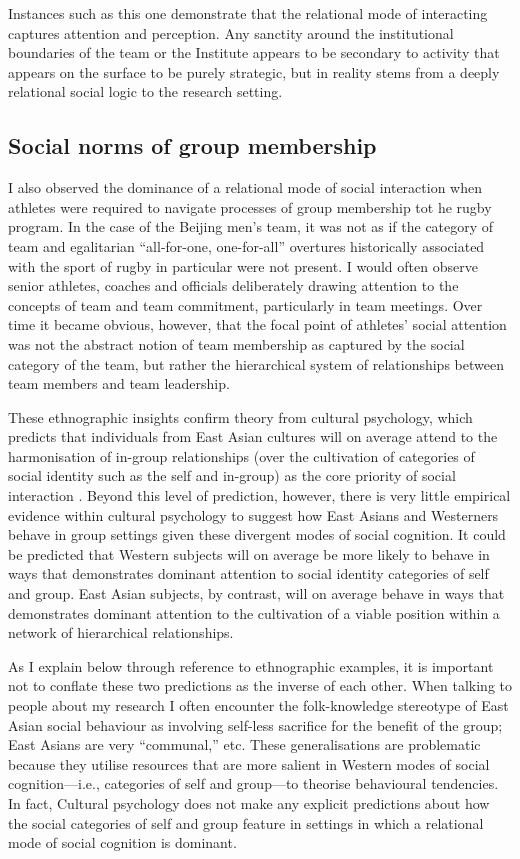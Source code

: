\begin{CJK}{UTF8}{gbsn}
Instances such as this one demonstrate that the relational mode of interacting captures attention and perception. Any sanctity around the institutional boundaries of the team or the Institute appears to be secondary to activity that appears on the surface to be purely strategic, but in reality stems from a deeply relational social logic to the research setting.


\subsection{Social norms of group membership \label{sect:groupMembership}}

I also observed the dominance of a relational mode of social interaction when athletes were required to navigate processes of group membership tot he rugby program.  In the case of the Beijing men's team, it was not as if the category of team and egalitarian ``all-for-one, one-for-all'' overtures historically associated with the sport of rugby in particular were not present.  I would often observe senior athletes, coaches and officials deliberately drawing attention to the concepts of team and team commitment, particularly in team meetings.  Over time it became obvious, however, that the focal point of athletes' social attention was not the abstract notion of team membership as captured by the social category of the team, but rather the hierarchical system of relationships between team members and team leadership.

These ethnographic insights confirm theory from cultural psychology, which predicts that individuals from East Asian cultures will on average attend to the harmonisation of in-group relationships (over the cultivation of categories of social identity such as the self and in-group) as the core priority of social interaction \citep{Yuki2003,Nisbett2003}.  Beyond this level of prediction, however, there is very little empirical evidence within cultural psychology to suggest how East Asians and Westerners behave in group settings given these divergent modes of social cognition.  It could be predicted that Western subjects will on average be more likely to behave in ways that demonstrates dominant attention to social identity categories of self and group.  East Asian subjects, by contrast, will on average behave in ways that demonstrates dominant attention to the cultivation of a viable position within a network of hierarchical relationships.

As I explain below through reference to ethnographic examples, it is important not to conflate these two predictions as the inverse of each other.  When talking to people about my research I often encounter the folk-knowledge stereotype of East Asian social behaviour as involving self-less sacrifice for the benefit of the group; East Asians are very ``communal,'' etc.  These generalisations are problematic because they utilise resources that are more salient in Western modes of social cognition---i.e., categories of self and group---to theorise behavioural tendencies.  In fact, Cultural psychology does not make any explicit predictions about how the social categories of self and group feature in settings in which a relational mode of social cognition is dominant.


\end{CJK}
